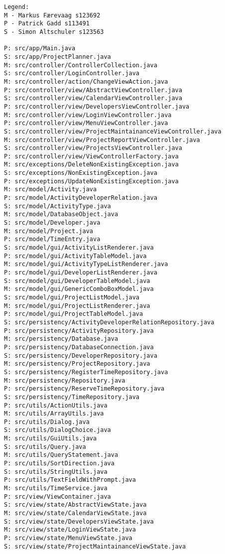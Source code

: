 \begin{verbatim}
Legend:
M - Markus Færevaag s123692
P - Patrick Gadd s113491
S - Simon Altschuler s123563

P: src/app/Main.java
S: src/app/ProjectPlanner.java
M: src/controller/ControllerCollection.java
S: src/controller/LoginController.java
M: src/controller/action/ChangeViewAction.java
P: src/controller/view/AbstractViewController.java
S: src/controller/view/CalendarViewController.java
P: src/controller/view/DevelopersViewController.java
M: src/controller/view/LoginViewController.java
P: src/controller/view/MenuViewController.java
S: src/controller/view/ProjectMaintainanceViewController.java
M: src/controller/view/ProjectReportViewController.java
S: src/controller/view/ProjectsViewController.java
P: src/controller/view/ViewControllerFactory.java
M: src/exceptions/DeleteNonExistingException.java
S: src/exceptions/NonExistingException.java
P: src/exceptions/UpdateNonExistingException.java
M: src/model/Activity.java
P: src/model/ActivityDeveloperRelation.java
S: src/model/ActivityType.java
M: src/model/DatabaseObject.java
S: src/model/Developer.java
M: src/model/Project.java
P: src/model/TimeEntry.java
S: src/model/gui/ActivityListRenderer.java
P: src/model/gui/ActivityTableModel.java
M: src/model/gui/ActivityTypeListRenderer.java
P: src/model/gui/DeveloperListRenderer.java
S: src/model/gui/DeveloperTableModel.java
M: src/model/gui/GenericComboBoxModel.java
S: src/model/gui/ProjectListModel.java
M: src/model/gui/ProjectListRenderer.java
P: src/model/gui/ProjectTableModel.java
S: src/persistency/ActivityDeveloperRelationRepository.java
P: src/persistency/ActivityRepository.java
M: src/persistency/Database.java
P: src/persistency/DatabaseConnection.java
S: src/persistency/DeveloperRepository.java
M: src/persistency/ProjectRepository.java
S: src/persistency/RegisterTimeRepository.java
M: src/persistency/Repository.java
P: src/persistency/ReserveTimeRepository.java
S: src/persistency/TimeRepository.java
P: src/utils/ActionUtils.java
M: src/utils/ArrayUtils.java
P: src/utils/Dialog.java
S: src/utils/DialogChoice.java
M: src/utils/GuiUtils.java
S: src/utils/Query.java
M: src/utils/QueryStatement.java
P: src/utils/SortDirection.java
S: src/utils/StringUtils.java
P: src/utils/TextFieldWithPrompt.java
M: src/utils/TimeService.java
P: src/view/ViewContainer.java
S: src/view/state/AbstractViewState.java
M: src/view/state/CalendarViewState.java
S: src/view/state/DevelopersViewState.java
M: src/view/state/LoginViewState.java
P: src/view/state/MenuViewState.java
S: src/view/state/ProjectMaintainanceViewState.java

\end{verbatim}
